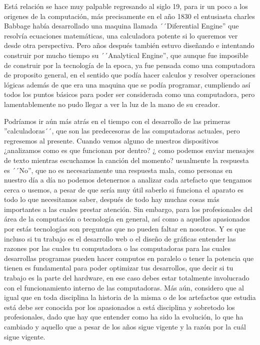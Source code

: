 \documentclass[letterpaper,12pt,oneside]{book}
\begin{document}
	
	Está relación se hace muy palpable regresando al siglo 19, para ir un poco a los origenes de la computación,
    más precisamente en el año 1830 el entusiasta charles Babbage había desarrollado una maquina llamada ´´Diferential Engine''
	que resolvía ecuaciones matemáticas, una calculadora potente si lo queremos ver desde otra perspectiva. Pero años después también estuvo diseñando e intentando 
	construir por mucho tiempo su ´´Analytical Engine'', que aunque fue imposible de construir por la tecnología de la epoca, ya fue pensada como una computadora
	de proposito general, en el sentido que podía hacer calculos y resolver operaciones lógicas además de que era una maquina que se podía programar,
	cumpliendo así todos los puntos básicos para poder ser considerada como una computadora, pero lamentablemente no pudo llegar a ver la luz de la mano
	de su creador.
	
	Podríamos ir aún más atrás en el tiempo con el desarrollo de las primeras ''calculadoras´´, que son las predecesoras de las
	computadoras actuales, pero regresemos al presente. Cuando vemos alguno de nuestros dispositivos ¿analizamos como es que funcionan por dentro? ¿ como podemos enviar mensajes de texto mientras escuchamos la canción del momento?
	usualmente la respuesta es ´´No'', que no es necesariamente una respuesta mala, como personas en nuestro día a día no podemos detenernos a analizar cada artefacto que tengamos cerca o usemos, a pesar de que sería muy útil saberlo
	si funciona el aparato es todo lo que necesitamos saber, después de todo hay muchas cosas más importantes
	a las cuales prestar atención. Sin embargo, para los profesionales del área de la computación o tecnología en general, así como a aquellos apasionados
	por estás tecnologías son preguntas que no pueden faltar en nosotros. Y es que incluso si tu trabajo es el desarrollo web o
	el diseño de gráficas entender las razones por las cuales tu computadora o las computadoras para las cuales desarrollas programas pueden hacer computos
	en paralelo o tener la potencia que tienen es fundamental para poder optimizar tus desarrollos, que decir si tu trabajo es la parte del hardware, en ese
	caso debes estar totalmente involucrado con el funcionamiento interno de las computadoras.
	Más aún, considero que al igual que en toda disciplina la historia de la misma o de los artefactos que estudia está debe ser conocida por
	los apasionados a está disciplina y sobretodo los profesionales, dado que hay que entender como ha sido la evolución, lo que ha cambiado
	y aquello que a pesar de los años sigue vigente y la razón por la cuál sigue vigente.
	
\end{document}
